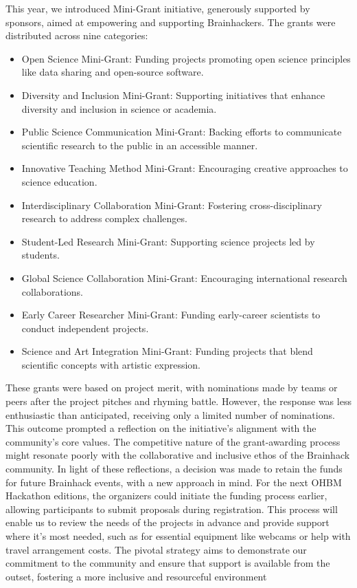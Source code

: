 \documentclass{article}
\begin{document}
This year, we introduced Mini-Grant initiative, generously supported by sponsors, aimed at empowering and supporting Brainhackers. The grants were distributed across nine categories:
\begin{itemize}
\item Open Science Mini-Grant: Funding projects promoting open science principles like data sharing and open-source software.
\item Diversity and Inclusion Mini-Grant: Supporting initiatives that enhance diversity and inclusion in science or academia.
\item Public Science Communication Mini-Grant: Backing efforts to communicate scientific research to the public in an accessible manner.
\item Innovative Teaching Method Mini-Grant: Encouraging creative approaches to science education.
\item Interdisciplinary Collaboration Mini-Grant: Fostering cross-disciplinary research to address complex challenges.
\item Student-Led Research Mini-Grant: Supporting science projects led by students.
\item Global Science Collaboration Mini-Grant: Encouraging international research collaborations.
\item Early Career Researcher Mini-Grant: Funding early-career scientists to conduct independent projects.
\item Science and Art Integration Mini-Grant: Funding projects that blend scientific concepts with artistic expression.
\end{itemize}

These grants were based on project merit, with nominations made by teams or peers after the project pitches and rhyming battle.
However, the response was less enthusiastic than anticipated, receiving only a limited number of nominations.
This outcome prompted a reflection on the initiative's alignment with the community's core values.
The competitive nature of the grant-awarding process might resonate poorly with the collaborative and inclusive ethos of the Brainhack community.
In light of these reflections, a decision was made to retain the funds for future Brainhack events, with a new approach in mind.
For the next OHBM Hackathon editions, the organizers could initiate the funding process earlier, allowing participants to submit proposals during registration.
This process will enable us to review the needs of the projects in advance and provide support where it's most needed, such as for essential equipment like webcams or help with travel arrangement costs.
The pivotal strategy aims to demonstrate our commitment to the community and ensure that support is available from the outset, fostering a more inclusive and resourceful environment
\end{document}
